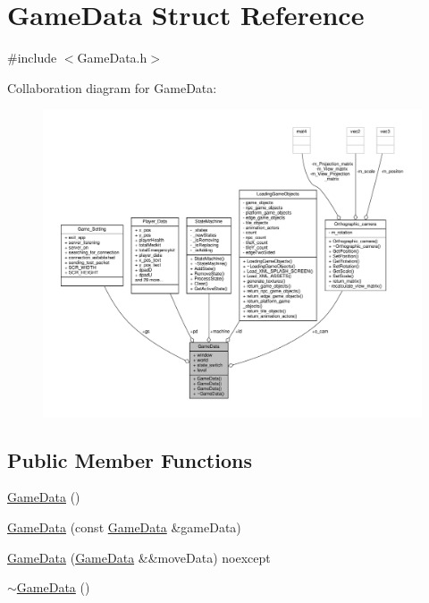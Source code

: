 \hypertarget{structGameData}{}\section{Game\+Data Struct Reference}
\label{structGameData}


{\ttfamily \#include $<$Game\+Data.\+h$>$}



Collaboration diagram for Game\+Data\+:
\nopagebreak
\begin{figure}[H]
\begin{center}
\leavevmode
\includegraphics[width=350pt]{structGameData__coll__graph}
\end{center}
\end{figure}
\subsection*{Public Member Functions}
\begin{DoxyCompactItemize}
\item 
\hyperlink{structGameData_a67ab18c5a35df618e99983275c7552ab}{Game\+Data} ()
\item 
\hyperlink{structGameData_a943bccfc17785aff39f0fceb643a5f9d}{Game\+Data} (const \hyperlink{structGameData}{Game\+Data} \&game\+Data)
\item 
\hyperlink{structGameData_a2a34c148fd6e7fbf9d3f3e3cc6c4e675}{Game\+Data} (\hyperlink{structGameData}{Game\+Data} \&\&move\+Data) noexcept
\item 
\hyperlink{structGameData_abd51e710bc262e278a8895f2e0b35a9f}{$\sim$\+Game\+Data} ()
\end{DoxyCompactItemize}
